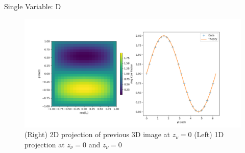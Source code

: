 \documentclass{beamer}
\begin{document}
\begin{frame}{Single Variable: D}
	\begin{figure}
		\centering
		\includegraphics[width=0.8\paperwidth]{plots/crosssections_D.png}
		\caption{(Right) 2D projection of previous 3D image at $z_\nu = 0$ (Left) 1D projection at $z_\nu = 0$ and $z_\nu = 0$ }
	\end{figure}
\end{frame}
\end{document}
